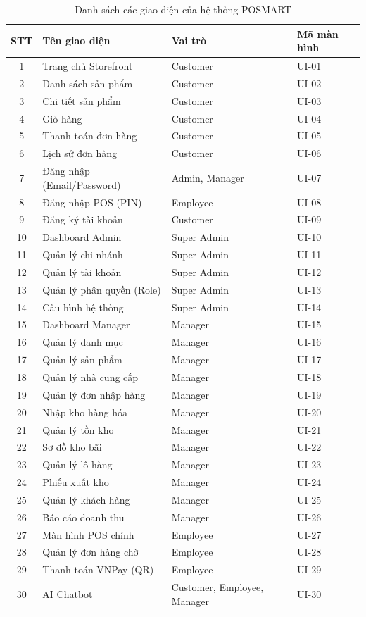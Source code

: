 \documentclass[12pt,a4paper]{report}
\begin{document}
\begin{table}[htbp]
\centering
\renewcommand{\arraystretch}{1.3}
\begin{tabular}{|c|l|l|l|}
\hline
\rowcolor[HTML]{EFEFEF}
\textbf{STT} & \textbf{Tên giao diện} & \textbf{Vai trò} & \textbf{Mã màn hình} \\ \hline
1 & Trang chủ Storefront & Customer & UI-01 \\ \hline
2 & Danh sách sản phẩm & Customer & UI-02 \\ \hline
3 & Chi tiết sản phẩm & Customer & UI-03 \\ \hline
4 & Giỏ hàng & Customer & UI-04 \\ \hline
5 & Thanh toán đơn hàng & Customer & UI-05 \\ \hline
6 & Lịch sử đơn hàng & Customer & UI-06 \\ \hline
7 & Đăng nhập (Email/Password) & Admin, Manager & UI-07 \\ \hline
8 & Đăng nhập POS (PIN) & Employee & UI-08 \\ \hline
9 & Đăng ký tài khoản & Customer & UI-09 \\ \hline
10 & Dashboard Admin & Super Admin & UI-10 \\ \hline
11 & Quản lý chi nhánh & Super Admin & UI-11 \\ \hline
12 & Quản lý tài khoản & Super Admin & UI-12 \\ \hline
13 & Quản lý phân quyền (Role) & Super Admin & UI-13 \\ \hline
14 & Cấu hình hệ thống & Super Admin & UI-14 \\ \hline
15 & Dashboard Manager & Manager & UI-15 \\ \hline
16 & Quản lý danh mục & Manager & UI-16 \\ \hline
17 & Quản lý sản phẩm & Manager & UI-17 \\ \hline
18 & Quản lý nhà cung cấp & Manager & UI-18 \\ \hline
19 & Quản lý đơn nhập hàng & Manager & UI-19 \\ \hline
20 & Nhập kho hàng hóa & Manager & UI-20 \\ \hline
21 & Quản lý tồn kho & Manager & UI-21 \\ \hline
22 & Sơ đồ kho bãi & Manager & UI-22 \\ \hline
23 & Quản lý lô hàng & Manager & UI-23 \\ \hline
24 & Phiếu xuất kho & Manager & UI-24 \\ \hline
25 & Quản lý khách hàng & Manager & UI-25 \\ \hline
26 & Báo cáo doanh thu & Manager & UI-26 \\ \hline
27 & Màn hình POS chính & Employee & UI-27 \\ \hline
28 & Quản lý đơn hàng chờ & Employee & UI-28 \\ \hline
29 & Thanh toán VNPay (QR) & Employee & UI-29 \\ \hline
30 & AI Chatbot & Customer, Employee, Manager & UI-30 \\ \hline
\end{tabular}
\caption{Danh sách các giao diện của hệ thống POSMART}
\end{table}
\end{document}

